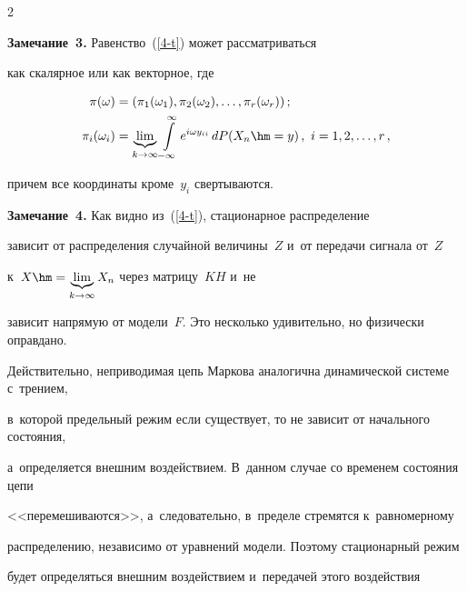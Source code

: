 \begin{multicols}{2}
\noindent

\textbf{Замечание~3.} Равенство~(\ref{4-t})  может рассматриваться

как скалярное или как векторное, где



\noindent

\begin{align*}

\pi(\omega)&=(\pi_1(\omega_1), \pi_2(\omega_2), \ldots ,\pi_r(\omega_r))\,;\\

\pi_i(\omega_i)&=\underbrace{\lim}_{k\rightarrow \infty}

\int\limits^\infty_{-\infty}e^{i \omega y_{ii}}\, dP(X_{n}\hm=y)\,,\

i=1,2,\ldots,r\,,

\end{align*}



\vspace*{-2pt}



\noindent

 причем все координаты кроме~$y_i$ свертываются.



\smallskip



\noindent

\textbf{Замечание~4.} Как видно из~(\ref{4-t}), стационарное распределение

зависит от распределения случайной величины~$Z$ и~от передачи сигнала от~$Z$

к~$X\hm=\underbrace{\lim}_{k\rightarrow \infty} X_n$ через матрицу~$KH$ и~не

зависит напрямую от модели~$F$. Это несколько удивительно, но физически оправдано.

Действительно, неприводимая цепь Маркова аналогична динамической системе с~трением,

в~которой предельный режим если существует, то не зависит от начального состояния,

а~определяется внешним воздействием. В~данном случае со временем состояния цепи

<<перемешиваются>>, а~следовательно, в~пределе стремятся к~равномерному

распределению, независимо от уравнений модели. Поэтому стационарный режим

будет определяться внешним воздействием и~передачей этого воздействия


\end{multicols}
